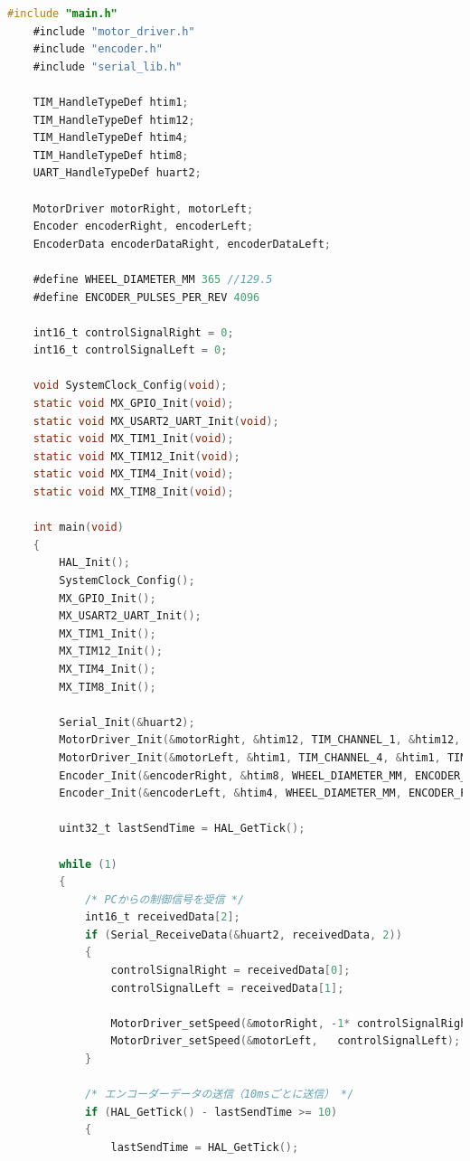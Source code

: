 \begin{lstlisting}[language=C, caption=メインコード(main.c)]
    #include "main.h"
    #include "motor_driver.h"
    #include "encoder.h"
    #include "serial_lib.h"
    
    TIM_HandleTypeDef htim1;
    TIM_HandleTypeDef htim12;
    TIM_HandleTypeDef htim4;
    TIM_HandleTypeDef htim8;
    UART_HandleTypeDef huart2;
    
    MotorDriver motorRight, motorLeft;
    Encoder encoderRight, encoderLeft;
    EncoderData encoderDataRight, encoderDataLeft;
    
    #define WHEEL_DIAMETER_MM 365 //129.5
    #define ENCODER_PULSES_PER_REV 4096
    
    int16_t controlSignalRight = 0;
    int16_t controlSignalLeft = 0;
    
    void SystemClock_Config(void);
    static void MX_GPIO_Init(void);
    static void MX_USART2_UART_Init(void);
    static void MX_TIM1_Init(void);
    static void MX_TIM12_Init(void);
    static void MX_TIM4_Init(void);
    static void MX_TIM8_Init(void);
    
    int main(void)
    {
        HAL_Init();
        SystemClock_Config();
        MX_GPIO_Init();
        MX_USART2_UART_Init();
        MX_TIM1_Init();
        MX_TIM12_Init();
        MX_TIM4_Init();
        MX_TIM8_Init();
    
        Serial_Init(&huart2);
        MotorDriver_Init(&motorRight, &htim12, TIM_CHANNEL_1, &htim12, TIM_CHANNEL_2);
        MotorDriver_Init(&motorLeft, &htim1, TIM_CHANNEL_4, &htim1, TIM_CHANNEL_1);
        Encoder_Init(&encoderRight, &htim8, WHEEL_DIAMETER_MM, ENCODER_PULSES_PER_REV, 10);
        Encoder_Init(&encoderLeft, &htim4, WHEEL_DIAMETER_MM, ENCODER_PULSES_PER_REV, 10);
    
        uint32_t lastSendTime = HAL_GetTick();
    
        while (1)
        {
            /* PCからの制御信号を受信 */
            int16_t receivedData[2];
            if (Serial_ReceiveData(&huart2, receivedData, 2))
            {
                controlSignalRight = receivedData[0];
                controlSignalLeft = receivedData[1];
    
                MotorDriver_setSpeed(&motorRight, -1* controlSignalRight);
                MotorDriver_setSpeed(&motorLeft,   controlSignalLeft);
            }
    
            /* エンコーダーデータの送信（10msごとに送信） */
            if (HAL_GetTick() - lastSendTime >= 10)
            {
                lastSendTime = HAL_GetTick();
    

\end{lstlisting}
